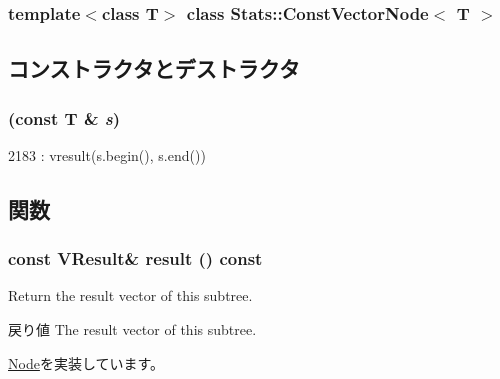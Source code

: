 \subsubsection*{template$<$class T$>$ class Stats::ConstVectorNode$<$ T $>$}



\subsection{コンストラクタとデストラクタ}
\hypertarget{classStats_1_1ConstVectorNode_acb62822dfc572500e8f10d000269fd12}{
\subsubsection[{ConstVectorNode}]{ (const T \& {\em s})}}
\label{classStats_1_1ConstVectorNode_acb62822dfc572500e8f10d000269fd12}



\begin{DoxyCode}
2183 : vresult(s.begin(), s.end()) {}
\end{DoxyCode}


\subsection{関数}
\hypertarget{classStats_1_1ConstVectorNode_aba312f9e3431b1652f8b3ddf3fe105dc}{
\subsubsection[{result}]{\setlength{\rightskip}{0pt plus 5cm}const {\bf VResult}\& result () const}}
\label{classStats_1_1ConstVectorNode_aba312f9e3431b1652f8b3ddf3fe105dc}
Return the result vector of this subtree. \begin{DoxyReturn}{戻り値}
The result vector of this subtree. 
\end{DoxyReturn}


\hyperlink{classStats_1_1Node_a7fcf57115122663db42f39cc18ca0f62}{Node}を実装しています。


